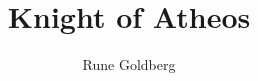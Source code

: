 \documentclass[ebook,11pt,oneside,openany]{memoir}
\begin{document}
\title{Knight of Atheos}
\author{Rune Goldberg}
\date{}
\maketitle

\newpage


\end{document}
